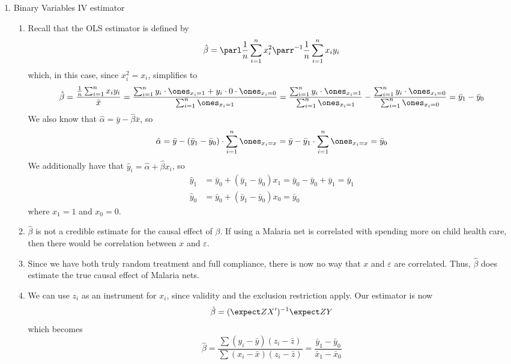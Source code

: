 \documentclass[10pt]{article}
\begin{document}
\maketitle

\begin{enumerate}
	\item Binary Variables IV estimator \begin{enumerate} \item Recall that the OLS estimator is defined by \[\hat{\beta} = \parl \frac{1}{n}\sum_{i=1}^n x_i^2\parr^{-1} \frac{1}{n}\sum_{i=1}^n x_iy_i\]which, in this case, since $x_i^2 = x_i$, simplifies to\[\hat{\beta} = \frac{\frac{1}{n}\sum_{i=1}^n x_iy_i}{\bar{x}} = \frac{\sum_{i=1}^n y_i \cdot \ones_{x_i = 1} + y_i \cdot 0 \cdot \ones_{x_i=0}}{\sum_{i=1}^n \ones_{x_i = 1}} = \frac{\sum_{i=1}^n y_i \cdot \ones_{x_i=1}}{\sum_{i=1}^n \ones_{x_i=1}} - \frac{\sum_{i=1}^n y_i \cdot \ones_{x_i=0}}{\sum_{i=1}^n \ones_{x_i=0}} = \bar{y}_1 - \bar{y}_0\]We also know that $\hat{\alpha} = \bar{y} - \hat{\beta}\bar{x}$, so\[\hat{\alpha} = \bar{y} - (\bar{y}_1-\bar{y}_0) \cdot \sum_{i=1}^n\ones_{x_i=x} = \bar{y} - \bar{y}_1\cdot \sum_{i=1}^n\ones_{x_i=x} = \bar{y}_0\]We additionally have that $\hat{y}_i = \hat{\alpha} + \hat{\beta} x_i$, so\begin{align*} \hat{y}_1 &= \bar{y}_0 + (\bar{y}_1 - \bar{y}_0)x_1 = \bar{y}_0 - \bar{y}_0 + \bar{y}_1 = \bar{y}_1 \\\hat{y}_0 &= \bar{y}_0 + (\bar{y}_1 - \bar{y}_0)x_0 = \bar{y}_0 \end{align*}where $x_1 = 1$ and $x_0 = 0$. \item $\hat{\beta}$ is not a credible estimate for the causal effect of $\beta$. If using a Malaria net is correlated with spending more on child health care, then there would be correlation between $x$ and $\varepsilon$. \item Since we have both truly random treatment and full compliance, there is now no way that $x$ and $\varepsilon$ are correlated. Thus, $\hat{\beta}$ does estimate the true causal effect of Malaria nets. \item We can use $z_i$ as an instrument for $x_i$, since validity and the exclusion restriction apply. Our estimator is now \[\hat{\beta} = (\expect ZX')^{-1}\expect ZY\]which becomes\[\hat{\beta}= \frac{\sum(y_i - \bar{y})(z_i - \bar{z})}{\sum(x_i-\bar{x})(z_i-\bar{z})} = \frac{\bar{y}_1 - \bar{y}_0}{\bar{x}_1 - \bar{x}_0}\]\end{enumerate}

\end{enumerate}
\end{document}
